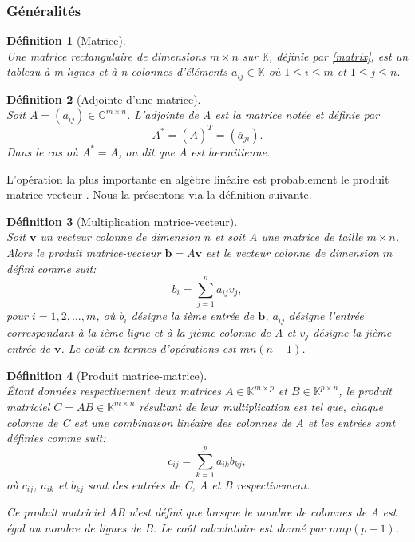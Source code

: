 \documentclass[11pt,a4paper,oneside]{book}
\newtheorem{defi}{Définition}[chapter]
\def\C{\mathbb C}
\def\K{\mathbb K}
\def\b{\mathbf b}
\def\v{\mathbf v}
\newcommand{\mbf}[1]{\mathbf{#1}}
\begin{document}
\subsubsection{Généralités}
\label{ssec:matrixgen}
\begin{defi}[Matrice]
	\emph{\\}
	Une matrice rectangulaire de dimensions $ m\times n $ sur $ \K $, définie par \eqref{matrix}, est  un tableau à m
	lignes et à n colonnes d'éléments $ a_{ij}\in \K $ où $ 1\leq i\leq m$ et $ 1\leq j\leq n.$
\end{defi}

\begin{defi}[Adjointe d'une matrice]\emph{\\}
Soit $ A=(a_{ij})\in\C^{m\times n} $. L'adjointe de A est la matrice notée et définie par $$ A^{*}=(\overline{A})^{T}=(\overline{a}_{ji}). $$ Dans le cas où $ A^{*}=A $, on dit que A est hermitienne.
\end{defi}
L’opération la plus importante en algèbre linéaire est probablement le produit matrice-vecteur \cite[p.2311]{oseledets2011tensor}. Nous la présentons via la définition suivante.
\begin{defi}[Multiplication matrice-vecteur]\emph{\\}
Soit $ \v $ un vecteur colonne de dimension $ n $ et soit A une matrice de taille $ m\times n $. Alors le produit matrice-vecteur $ \mbf{b} = A\v $ est le vecteur colonne de dimension $ m $ défini comme suit:
\begin{equation}\label{Matvec}
b_{i}=\sum_{j=1}^{n}a_{ij}v_{j},
\end{equation}
pour $ i = 1,2,...,m $, où $b_{i} $ désigne la ième entrée de $ \b $, $ a_{ij} $ désigne l'entrée correspondant à la ième ligne et à la jième colonne de A et $ v_{j} $ désigne la jième entrée de $ \v $.
Le coût en termes d'opérations est $mn(n-1) $.
\end{defi}
\begin{defi}[Produit matrice-matrice]\emph{\\}
 Étant données respectivement deux matrices $ A\in\K^{m\times p} $  et $ B\in\K^{p\times n} $, le produit matriciel $ C=AB\in\K^{m\times n} $  résultant de leur multiplication est tel que, chaque colonne de C est une combinaison linéaire des colonnes de A et les entrées sont définies comme suit:
 \begin{equation}\label{prodmat}
 c_{ij}=\sum_{k=1}^{p}a_{ik}b_{kj},
 \end{equation}
où $ c_{ij} $, $ a_{ik} $ et $ b_{kj} $ sont des entrées de C, A et B respectivement.

Ce produit matriciel AB n'est défini que lorsque le nombre de colonnes de A est égal au nombre de lignes de B. Le coût calculatoire est donné par $ mnp(p - 1) $.
\end{defi}
\end{document}
